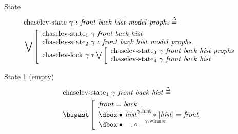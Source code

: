 \begin{frame}{State}
\small
\begin{align*}
		&\mathrm{chaselev \mathhyphen state}\ \gamma\ \iota\ \mathit{front}\ \mathit{back}\ \mathit{hist}\ \mathit{model}\ \mathit{prophs}
		\eqdef
	\\
		&\bigvee\left[\begin{array}{l}
				\mathrm{chaselev \mathhyphen state_1}\ \gamma\ \mathit{front}\ \mathit{back}\ \mathit{hist}
			\\
				\mathrm{chaselev \mathhyphen state_2}\ \gamma\ \iota\ \mathit{front}\ \mathit{back}\ \mathit{hist}\ \mathit{model}\ \mathit{prophs}
			\\
				\mathrm{chaselev \mathhyphen lock}\ \gamma \iSep
				\bigvee\left[\begin{array}{l}
						\mathrm{chaselev \mathhyphen state_3}\ \gamma\ \mathit{front}\ \mathit{back}\ \mathit{hist}\ \mathit{prophs}
					\\
						\mathrm{chaselev \mathhyphen state_4}\ \gamma\ \mathit{front}\ \mathit{back}\ \mathit{hist}
				\end{array}\right.
		\end{array}\right.
\end{align*}
\end{frame}


\begin{frame}{State 1 (empty)}
\begin{align*}
		&\mathrm{chaselev \mathhyphen state_1}\ \gamma\ \mathit{front}\ \mathit{back}\ \mathit{hist}
		\eqdef
	\\
		&\iBigsep\left[\begin{array}{l}
				\mathit{front} = \mathit{back}
			\\
				\iGhost{\gamma\mathrm{.hist}}{\iAuth{\mathit{hist}}} \iSep
				| \mathit{hist} | = \mathit{front}
			\\
				\iGhost{\gamma\mathrm{.winner}}{\iAuth{-} \ldotp \iFrag{-}}
		\end{array}\right.
\end{align*}
\end{frame}


